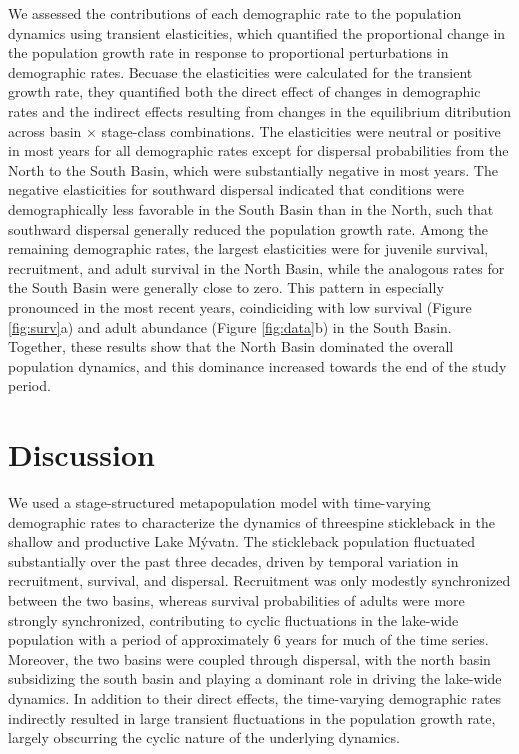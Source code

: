 \documentclass[11pt]{article}
\begin{document}
We assessed the contributions of each demographic rate to the population dynamics
using transient elasticities,
which quantified the proportional change in the population growth rate in 
response to proportional perturbations in demographic rates.
Becuase the elasticities were calculated for the transient growth rate,
they quantified both the direct effect of changes in demographic rates 
and the indirect effects resulting from changes in the equilibrium ditribution
across basin $\times$ stage-class combinations.
The elasticities were neutral or positive in most years for all demographic rates 
except for dispersal probabilities from the North to the South Basin,
which were substantially negative in most years.
The negative elasticities for southward dispersal indicated that conditions were 
demographically less favorable in the South Basin than in the North,
such that southward dispersal generally reduced the population growth rate.
Among the remaining demographic rates,
the largest elasticities were for juvenile survival, recruitment, and adult survival
in the North Basin, while the analogous rates for the South Basin were generally close to zero.
This pattern in especially pronounced in the most recent years,
coindiciding with low survival (Figure \ref{fig:surv}a) 
and adult abundance (Figure \ref{fig:data}b) in the South Basin.
Together, these results show that the North Basin dominated 
the overall population dynamics, 
and this dominance increased towards the end of the study period.








\section*{Discussion}

We used a stage-structured metapopulation model 
with time-varying demographic rates to characterize the 
dynamics of threespine stickleback in the shallow and productive Lake M\'{y}vatn.
The stickleback population fluctuated substantially over the past three decades,
driven by  temporal variation in recruitment, survival, and dispersal.
Recruitment was only modestly synchronized between the two basins, 
whereas survival probabilities of adults were more strongly synchronized, 
contributing to cyclic fluctuations in the lake-wide population 
with a period of approximately 6 years for much of the time series. 
Moreover, the two basins were coupled through dispersal, 
with the north basin subsidizing the south basin and playing a dominant role 
in driving the lake-wide dynamics. 
In addition to their direct effects, the time-varying demographic rates 
indirectly resulted in large transient fluctuations in the population growth rate,
largely obscurring the cyclic nature of the underlying dynamics.
\end{document}
